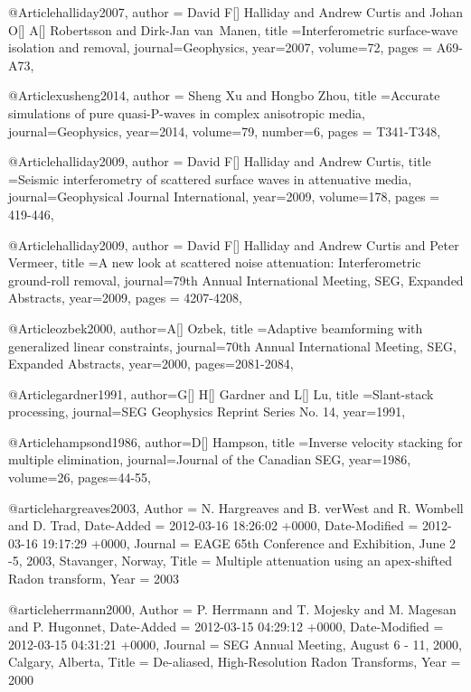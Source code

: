 @Article{halliday2007,
  author = {David F[] Halliday and Andrew Curtis  and Johan O[] A[] Robertsson and Dirk-Jan van~Manen},
  title ={Interferometric surface-wave isolation and removal},
  journal={Geophysics},
  year=2007,
  volume={72},
  pages = {A69-A73},
}

@Article{xusheng2014,
  author = {Sheng Xu and Hongbo Zhou},
  title ={Accurate simulations of pure quasi-P-waves in complex anisotropic media},
  journal={Geophysics},
  year=2014,
  volume={79},
  number=6,
  pages = {T341-T348},
}

@Article{halliday2009,
  author = {David F[] Halliday and Andrew Curtis},
  title ={Seismic interferometry of scattered surface waves in attenuative media},
  journal={Geophysical Journal International},
  year=2009,
  volume={178},
  pages = {419-446},
}





@Article{halliday2009,
  author = {David F[] Halliday and Andrew Curtis and Peter Vermeer},
  title ={A new look at scattered noise attenuation: Interferometric ground-roll removal},
  journal={79th Annual International Meeting, SEG, Expanded Abstracts},
  year=2009,
  pages = {4207-4208},
}

@Article{ozbek2000,
  author={A[] Ozbek},
  title ={Adaptive beamforming with generalized linear constraints},
  journal={70th Annual International Meeting, SEG, Expanded Abstracts},
  year=2000,
  pages={2081-2084},
}



@Article{gardner1991,
  author={G[] H[] Gardner and L[] Lu},
  title ={Slant-stack processing},
  journal={SEG Geophysics Reprint Series No. 14},
  year=1991,
}

@Article{hampsond1986,
  author={D[] Hampson},
  title ={Inverse velocity stacking for multiple elimination},
  journal={Journal of the Canadian SEG},
  year=1986,
  volume=26,
  pages={44-55},
}

@article{hargreaves2003,
	Author = {N. Hargreaves and B. verWest and R. Wombell and D. Trad},
	Date-Added = {2012-03-16 18:26:02 +0000},
	Date-Modified = {2012-03-16 19:17:29 +0000},
	Journal = {EAGE 65th Conference and Exhibition, June 2 -5, 2003, Stavanger, Norway},
	Title = {Multiple attenuation using an apex-shifted {R}adon transform},
	Year = {2003}}

@article{herrmann2000,
	Author = {P. Herrmann and T. Mojesky and M. Magesan and P. Hugonnet},
	Date-Added = {2012-03-15 04:29:12 +0000},
	Date-Modified = {2012-03-15 04:31:21 +0000},
	Journal = {SEG Annual Meeting, August 6 - 11, 2000, Calgary, Alberta},
	Title = {De-aliased, High-Resolution {R}adon Transforms},
	Year = {2000}}

